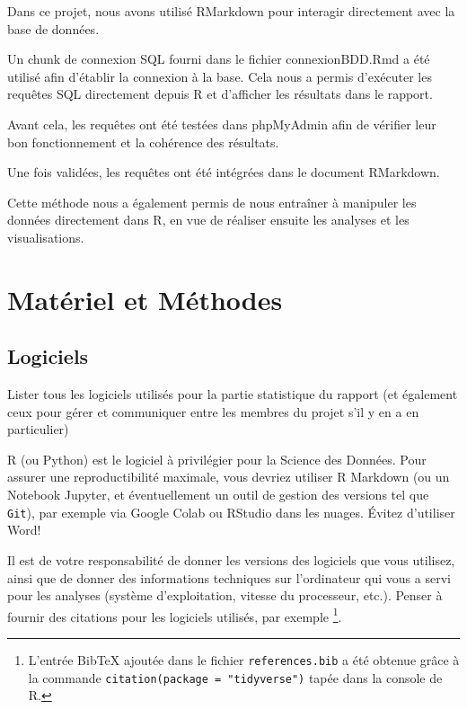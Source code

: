 \documentclass[mstat,12pt]{unswthesis}
\begin{document}
Dans ce projet, nous avons utilisé RMarkdown pour interagir directement
avec la base de données.

Un chunk de connexion SQL fourni dans le fichier connexionBDD.Rmd a été
utilisé afin d'établir la connexion à la base. Cela nous a permis
d'exécuter les requêtes SQL directement depuis R et d'afficher les
résultats dans le rapport.

Avant cela, les requêtes ont été testées dans phpMyAdmin afin de
vérifier leur bon fonctionnement et la cohérence des résultats.

Une fois validées, les requêtes ont été intégrées dans le document
RMarkdown.

Cette méthode nous a également permis de nous entraîner à manipuler les
données directement dans R, en vue de réaliser ensuite les analyses et
les visualisations.

\chapter{Matériel et Méthodes}\label{matuxe9riel-et-muxe9thodes}

\section{Logiciels}\label{logiciels}

Lister tous les logiciels utilisés pour la partie statistique du rapport
(et également ceux pour gérer et communiquer entre les membres du projet
s'il y en a en particulier)

\medskip

R (ou Python) est le logiciel à privilégier pour la Science des Données.
Pour assurer une reproductibilité maximale, vous devriez utiliser R
Markdown (ou un Notebook Jupyter, et éventuellement un outil de gestion
des versions tel que \texttt{Git}), par exemple via Google Colab ou
RStudio dans les nuages. Évitez d'utiliser Word!

\bigskip

Il est de votre responsabilité de donner les versions des logiciels que
vous utilisez, ainsi que de donner des informations techniques sur
l'ordinateur qui vous a servi pour les analyses (système d'exploitation,
vitesse du processeur, etc.). Penser à fournir des citations pour les
logiciels utilisés, par exemple
\footnote{L'entrée BibTeX ajoutée dans le fichier \texttt{references.bib} a été obtenue grâce à la commande  \texttt{citation(package = "tidyverse")} tapée dans la console de R.}.
\end{document}
